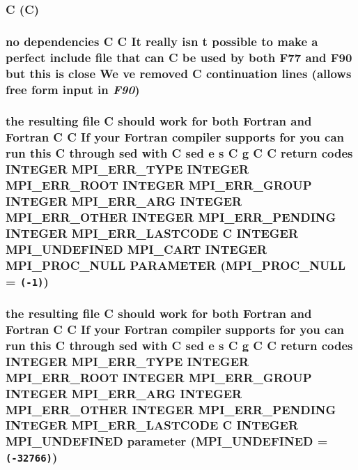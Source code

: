 \subsubsection{\setlength{\rightskip}{0pt plus 5cm}C (C)}\label{mpif_8h_5ca1110bc53ab1954705d212e4265d48}


\subsubsection{ no dependencies C C It really isn t possible to make a perfect include file that can C be used by both F77 and F90 but this is close We ve removed C continuation lines (allows free form input in {\em F90})}\label{mpif_8h_2493b2e6b1d0ba5c60b484a8b6421e86}


\subsubsection{\setlength{\rightskip}{0pt plus 5cm}the resulting file C should {\bf work} for both Fortran and Fortran C C If your Fortran compiler supports for you can run this C through sed {\bf with} C sed e s C g C C return codes INTEGER MPI\_\-ERR\_\-TYPE INTEGER MPI\_\-ERR\_\-ROOT INTEGER MPI\_\-ERR\_\-GROUP INTEGER MPI\_\-ERR\_\-ARG INTEGER MPI\_\-ERR\_\-OTHER INTEGER MPI\_\-ERR\_\-PENDING INTEGER MPI\_\-ERR\_\-LASTCODE C INTEGER MPI\_\-UNDEFINED MPI\_\-CART INTEGER MPI\_\-PROC\_\-NULL PARAMETER (MPI\_\-PROC\_\-NULL = {\tt (-1)})}\label{mpif_8h_5312ca67a174dea9e2a3bba05696745e}


\subsubsection{\setlength{\rightskip}{0pt plus 5cm}the resulting file C should {\bf work} for both Fortran and Fortran C C If your Fortran compiler supports for you can run this C through sed {\bf with} C sed e s C g C C return codes INTEGER MPI\_\-ERR\_\-TYPE INTEGER MPI\_\-ERR\_\-ROOT INTEGER MPI\_\-ERR\_\-GROUP INTEGER MPI\_\-ERR\_\-ARG INTEGER MPI\_\-ERR\_\-OTHER INTEGER MPI\_\-ERR\_\-PENDING INTEGER MPI\_\-ERR\_\-LASTCODE C INTEGER MPI\_\-UNDEFINED parameter (MPI\_\-UNDEFINED = {\tt (-32766)})}\label{mpif_8h_ab31459ae78d9f8288b875fab66c58d2}




